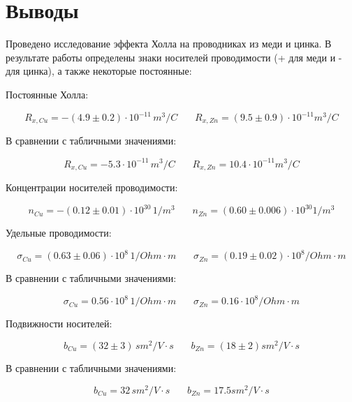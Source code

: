 \documentclass[12pt,a4paper]{scrartcl}
\begin{document}
	\section{Выводы}
	
	Проведено исследование эффекта Холла на проводниках из меди и цинка. В результате работы определены знаки носителей проводимости (+ для меди и - для цинка), а также некоторые постоянные:
	
	Постоянные Холла:
	
	$$R_{x, Cu} = -(4.9 \pm 0.2) \cdot 10^{-11}\, m^3/C\ \ \ \ \ \ \ \ R_{x, Zn} = (9.5 \pm 0.9) \cdot 10^{-11} m^3/C$$
	
	В сравнении с табличными значениями:
	
	$$R_{x, Cu} = -5.3 \cdot 10^{-11}\, m^3/C\ \ \ \ \ \ \ \ R_{x, Zn} = 10.4 \cdot 10^{-11} m^3/C$$
	
	Концентрации носителей проводимости:
		
	$$n_{Cu} = -(0.12 \pm 0.01) \cdot 10^{30}\, 1/m^3\ \ \ \ \ \ \ \ n_{Zn} = (0.60 \pm 0.006) \cdot 10^{30} 1/m^3$$
	
	Удельные проводимости:
	
		$$\sigma_{Cu} = (0.63 \pm 0.06) \cdot 10^{8}\, 1/Ohm \cdot m\ \ \ \ \ \ \ \ \sigma_{Zn} = (0.19 \pm 0.02) \cdot 10^{8} /Ohm \cdot m$$	
	
	В сравнении с табличными значениями:
	
	$$\sigma_{Cu} = 0.56 \cdot 10^{8}\, 1/Ohm \cdot m\ \ \ \ \ \ \ \ \sigma_{Zn} = 0.16 \cdot 10^{8} /Ohm \cdot m$$	
	
	Подвижности носителей:
	
	$$b_{Cu} = (32 \pm 3) \, sm^2/V \cdot s\ \ \ \ \ \ \ \ b_{Zn} = (18 \pm 2) sm^2/V \cdot s$$
	
	В сравнении с табличными значениями:

	$$b_{Cu} = 32 \, sm^2/V \cdot s\ \ \ \ \ \ \ \ b_{Zn} = 17.5 sm^2/V \cdot s$$
\end{document}
